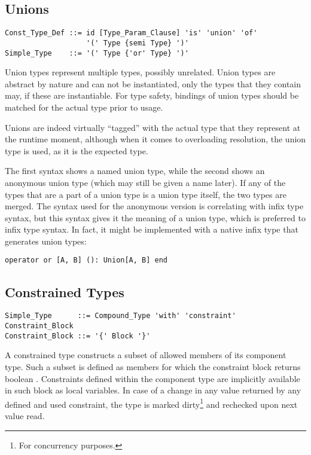 \subsection{Unions}
\label{sec:unions}

\syntax\begin{lstlisting}
Const_Type_Def ::= id [Type_Param_Clause] 'is' 'union' 'of'
                   '(' Type {semi Type} ')'
Simple_Type    ::= '(' Type {'or' Type} ')'
\end{lstlisting}

Union types represent multiple types, possibly unrelated. Union types are abstract by nature and can not be instantiated, only the types that they contain may, if these are instantiable. For type safety, bindings of union types should be matched for the actual type prior to usage. 

Unions are indeed virtually ``tagged'' with the actual type that they represent at the runtime moment, although when it comes to overloading resolution, the union type is used, as it is the expected type. 

The first syntax shows a named union type, while the second shows an anonymous union type (which may still be given a name later). If any of the types that are a part of a union type is a union type itself, the two types are merged. The syntax used for the anonymous version is correlating with infix type syntax, but this syntax gives it the meaning of a union type, which is preferred to infix type syntax. In fact, it might be implemented with a native infix type that generates union types:

\begin{lstlisting}
operator or [A, B] (): Union[A, B] end
\end{lstlisting}





\subsection{Constrained Types}
\label{sec:constrained-types}

\syntax\begin{lstlisting}
Simple_Type      ::= Compound_Type 'with' 'constraint' Constraint_Block
Constraint_Block ::= '{' Block '}'
\end{lstlisting}

A constrained type constructs a subset of allowed members of its component type. Such a subset is defined as members for which the constraint block returns boolean . Constraints defined within the component type are implicitly available in such block as local variables. In case of a change in any value returned by any defined and used constraint, the type is marked dirty\footnote{For concurrency purposes.} and rechecked upon next value read. 

